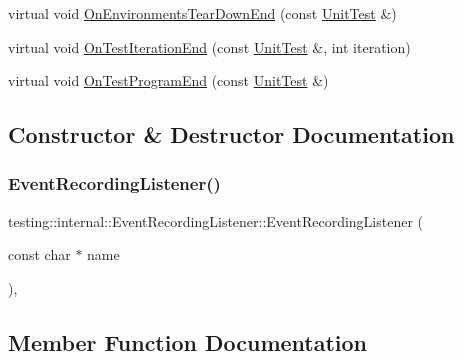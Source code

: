 \begin{DoxyCompactItemize}
\item 
virtual void \hyperlink{classtesting_1_1internal_1_1_event_recording_listener_acd5a3dc070265166a7da68222031fd61}{On\+Environments\+Tear\+Down\+End} (const \hyperlink{classtesting_1_1_unit_test}{Unit\+Test} \&)
\item 
virtual void \hyperlink{classtesting_1_1internal_1_1_event_recording_listener_ab0cc007bcfaf06cd383d574c88f62aea}{On\+Test\+Iteration\+End} (const \hyperlink{classtesting_1_1_unit_test}{Unit\+Test} \&, int iteration)
\item 
virtual void \hyperlink{classtesting_1_1internal_1_1_event_recording_listener_a21fe9c3c519c4599a48b16ddfb734aa3}{On\+Test\+Program\+End} (const \hyperlink{classtesting_1_1_unit_test}{Unit\+Test} \&)
\end{DoxyCompactItemize}


\subsection{Constructor \& Destructor Documentation}
\mbox{\label{classtesting_1_1internal_1_1_event_recording_listener_a7b0254c15d6b8468e1441ee572fee707}} 
\subsubsection{\texorpdfstring{Event\+Recording\+Listener()}{EventRecordingListener()}}
{\footnotesize\ttfamily testing\+::internal\+::\+Event\+Recording\+Listener\+::\+Event\+Recording\+Listener (\begin{DoxyParamCaption}\item[{const char $\ast$}]{name }\end{DoxyParamCaption})\hspace{0.3cm}{\ttfamily [inline]}, {\ttfamily [explicit]}}



\subsection{Member Function Documentation}
\mbox{\label{classtesting_1_1internal_1_1_event_recording_listener_a40b4c5e05abd1aa11a030f999f6adb8f}} 
